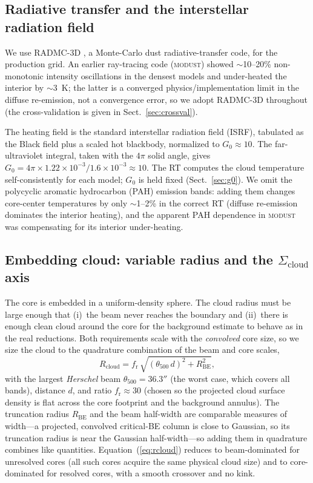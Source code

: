\documentclass[11pt,a4paper]{article}
\newcommand{\Rbe}{R_{\mathrm{BE}}}
\newcommand{\Scloud}{\Sigma_{\mathrm{cloud}}}
\newcommand{\Rcloud}{R_{\mathrm{cloud}}}
\begin{document}
\subsection{Radiative transfer and the interstellar radiation field}
\label{sec:rt}

We use RADMC-3D \citep{Dullemond+2012}, a Monte-Carlo dust radiative-transfer
code, for the production grid. An earlier
ray-tracing code (\textsc{modust}) showed $\sim$10--20\% non-monotonic
intensity oscillations in the densest models and under-heated the interior
by $\sim$3~K; the latter is a converged physics/implementation limit in the
diffuse re-emission, not a convergence error, so we adopt RADMC-3D
throughout (the cross-validation is given in Sect.~\ref{sec:crossval}).

The heating field is the standard interstellar radiation field (ISRF),
tabulated as the Black field plus a scaled hot blackbody, normalized to
$G_{0}\approx 10$. The far-ultraviolet integral, taken with the
$4\pi$ solid angle, gives
$G_{0}=4\pi\times 1.22\times10^{-3}/1.6\times10^{-3}\approx 10$. The RT
computes the cloud temperature self-consistently for each model; $G_{0}$ is
held fixed (Sect.~\ref{sec:g0}). We omit the polycyclic aromatic
hydrocarbon (PAH) emission bands: adding them changes core-center
temperatures by only $\sim$1--2\% in the correct RT (diffuse re-emission
dominates the interior heating), and the apparent PAH dependence in
\textsc{modust} was compensating for its interior under-heating.

\subsection{Embedding cloud: variable radius and the $\Scloud$ axis}
\label{sec:cloud}

The core is embedded in a uniform-density sphere. The cloud radius must be
large enough that (i)~the beam never reaches the boundary and (ii)~there is
enough clean cloud around the core for the background estimate to behave as
in the real reductions. Both requirements scale with the \emph{convolved}
core size, so we size the cloud to the quadrature combination of the
beam and core scales,
\begin{equation}
  \Rcloud = f_{\mathrm{r}}\,
  \sqrt{(\theta_{500}\,d)^{2} + \Rbe^{2}},
  \label{eq:rcloud}
\end{equation}
with the largest \emph{Herschel} beam $\theta_{500}=36.3''$ (the worst
case, which covers all bands), distance $d$, and ratio $f_{\mathrm{r}}\approx
30$ (chosen so the projected cloud surface density is flat across the core
footprint and the background annulus). The truncation radius $\Rbe$ and the
beam half-width are comparable measures of width---a projected, convolved
critical-BE column is close to Gaussian, so its truncation radius is near
the Gaussian half-width---so adding them in quadrature combines like
quantities. Equation~(\ref{eq:rcloud}) reduces to beam-dominated for
unresolved cores (all such cores acquire the same physical cloud size) and
to core-dominated for resolved cores, with a smooth crossover and no kink.
\end{document}
